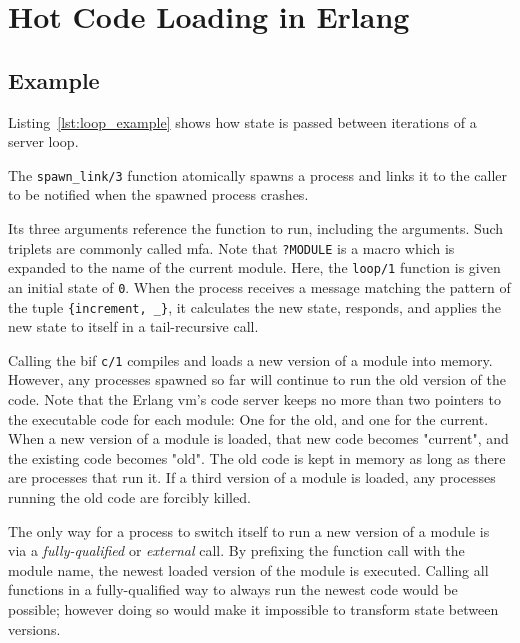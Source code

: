 \chapter{Hot Code Loading in Erlang}

\section{Example}



Listing~\ref{lst:loop_example} shows how state is passed between iterations of a server loop.

The \lstinline{spawn_link/3} function atomically spawns a process and links it to the caller to be notified when the spawned process crashes.

Its three arguments reference the function to run, including the arguments. Such triplets are commonly called \acrfull{mfa}. Note that \lstinline|?MODULE| is a macro which is expanded to the name of the current module. Here, the \lstinline{loop/1} function is given an initial state of \lstinline{0}. When the process receives a message matching the pattern of the tuple \lstinline|{increment, _}|, it calculates the new state, responds, and applies the new state to itself in a tail-recursive call.

Calling the \acrfull{bif} \lstinline|c/1| compiles and loads a new version of a module into memory. However, any processes spawned so far will continue to run the old version of the code. Note that the Erlang \acrshort{vm}'s code server keeps no more than two pointers to the executable code for each module: One for the old, and one for the current. When a new version of a module is loaded, that new code becomes "current", and the existing code becomes "old". The old code is kept in memory as long as there are processes that run it. If a third version of a module is loaded, any processes running the old code are forcibly killed.

The only way for a process to switch itself to run a new version of a module is via a \emph{fully-qualified} or \emph{external} call. By prefixing the function call with the module name, the newest loaded version of the module is executed. Calling all functions in a fully-qualified way to always run the newest code would be possible; however doing so would make it impossible to transform state between versions.

